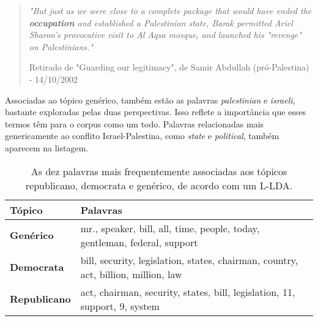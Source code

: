 \begin{quote}
\emph{"But just as we were close to a complete
package that would have ended the \textbf{occupation} and established a
Palestinian state, Barak permitted Ariel Sharon's provocative visit to
Al Aqsa mosque, and launched his "revenge" on Palestinians."} 

{\small Retirado de "Guarding our legitimacy", de Samir Abdullah (pró-Palestina) - 14/10/2002}
\end{quote}

Associadas ao tópico genérico, também estão as palavras \emph{palestinian} e \emph{israeli}, bastante exploradas pelas duas perspectivas. Isso reflete a importância que esses termos têm para o corpus como um todo. Palavras relacionadas mais genericamente ao conflito Israel-Palestina, como \emph{state} e \emph{political}, também aparecem na listagem. %





\begin{table}[h]
\label{freqs:tab2}
\centering
\begin{tabular}{| l | p{10cm} | }
\hline
\textbf{Tópico} & \textbf{Palavras} \\ \hline
\textbf{Genérico} & mr., speaker, bill, all, time, people, today, gentleman, federal, support \\ \hline
\textbf{Democrata} & bill, security, legislation, states, chairman, country, act, billion, million, law \\ \hline
\textbf{Republicano} & act, chairman, security, states, bill, legislation, 11, support, 9, system \\ \hline
\end{tabular}
\caption{As dez palavras mais frequentemente associadas aos tópicos republicano, democrata e genérico, de acordo com um L-LDA.}
\end{table}

